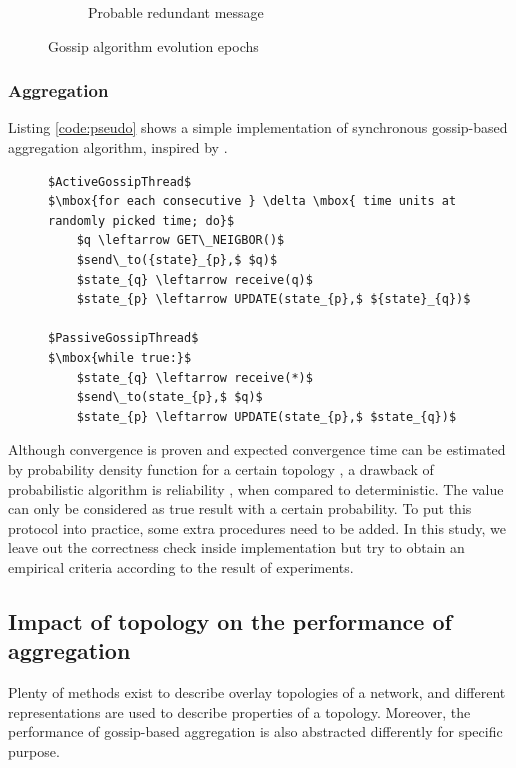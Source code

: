 \begin{figure}[h!]
\begin{center}
\begin{subfigure}[c]{0.45\textwidth}
      \caption{Probable redundant message}
   	\end{subfigure}
   \end{center}
   \caption{Gossip algorithm evolution epochs}
   \label{fig:epochs}
\end{figure}
\subsubsection{Aggregation}
Listing \ref{code:pseudo} shows a simple implementation of synchronous gossip-based aggregation algorithm, inspired by \cite{jelasity_gossip-based_2005}.
\begin{figure}[!h]
\begin{lstlisting}[caption={Pseudo Code for gossip-based aggregation}, label=code:pseudo, mathescape=true, captionpos=b]
$ActiveGossipThread$
$\mbox{for each consecutive } \delta \mbox{ time units at randomly picked time; do}$
    $q \leftarrow GET\_NEIGBOR()$
    $send\_to({state}_{p},$ $q)$
    $state_{q} \leftarrow receive(q)$
    $state_{p} \leftarrow UPDATE(state_{p},$ ${state}_{q})$

$PassiveGossipThread$
$\mbox{while true:}$
    $state_{q} \leftarrow receive(*)$
    $send\_to(state_{p},$ $q)$
    $state_{p} \leftarrow UPDATE(state_{p},$ $state_{q})$
\end{lstlisting}
\end{figure}

Although convergence is proven and expected convergence time can be estimated by probability density function for a certain topology \cite{5929538}, a drawback of probabilistic algorithm is reliability \cite{Lynch:1996:DA:525656}, when compared to deterministic. The value can only be considered as true result with a certain probability. To put this protocol into practice, some extra procedures need to be added. In this study, we leave out the correctness check inside implementation but try to obtain an empirical criteria according to the result of experiments.

\subsection{Impact of topology on the performance of aggregation}
Plenty of methods exist to describe overlay topologies of a network, and different representations are used to describe properties of a topology. Moreover, the performance of gossip-based aggregation is also abstracted differently for specific purpose.

